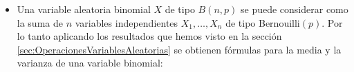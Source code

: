            \begin{itemize}

           \item Una variable aleatoria binomial $X$ de tipo $B(n,p)$ se puede considerar como la suma de $n$ variables independientes $X_1,\ldots,X_n$ de tipo Bernouilli$(p)$. Por lo tanto aplicando los  resultados que hemos visto en la sección \ref{sec:OperacionesVariablesAleatorias} se obtienen fórmulas para la media y la varianza de una variable binomial:\\[3mm]
           \\[3mm]



\end{itemize}

